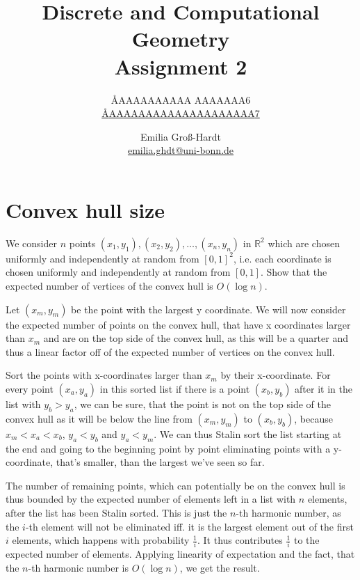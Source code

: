 \documentclass{article}
\title{Discrete and Computational Geometry \\ Assignment 2}
\author{
  \AA{AAAAAAAAAA AAAAAAA}{6} \\
  \href{mailto:\AA{AAAAAAAAAAAAAAAAAAAA}{7}}{\AA{AAAAAAAAAAAAAAAAAAAA}{7}}
  \and
  Emilia Groß-Hardt \\
  \href{mailto:emilia.ghdt@uni-bonn.de}{emilia.ghdt@uni-bonn.de}
}
\newcommand{\R}{\mathbb{R}}
\begin{document}
  \maketitle

  \section{Convex hull size}
  \begin{centerframebox}
    We consider $n$ points $(x_1, y_1), (x_2, y_2), \dots , (x_n, y_n)$ in $\R^2$ which are chosen uniformly and
    independently at random from $[0, 1]^2$, i.e. each coordinate is chosen uniformly and
    independently at random from $[0, 1]$.
    Show that the expected number of vertices of the convex hull is $O(\log n)$.
  \end{centerframebox}
  Let $(x_m, y_m)$ be the point with the largest y coordinate. We will now consider the expected number of points on the convex hull, that have x coordinates larger than $x_m$ and are on the top side of the convex hull, as this will be a quarter and thus a linear factor off of the expected number of vertices on the convex hull.

  Sort the points with x-coordinates larger than $x_m$ by their x-coordinate. For every point $(x_a, y_a)$ in this sorted list if there is a point $(x_b, y_b)$ after it in the list with $y_b > y_a$, we can be sure, that the point is not on the top side of the convex hull as it will be below the line from $(x_m, y_m)$ to $(x_b, y_b)$, because $x_m < x_a < x_b$, $y_a < y_b$ and $y_a < y_m$. We can thus Stalin sort the list starting at the end and going to the beginning point by point eliminating points with a y-coordinate, that's smaller, than the largest we've seen so far.

  The number of remaining points, which can potentially be on the convex hull is thus bounded by the expected number of elements left in a list with $n$ elements, after the list has been Stalin sorted.
  This is just the $n$-th harmonic number, as the $i$-th element will not be eliminated iff. it is the largest element out of the first $i$ elements, which happens with probability $\frac1i$. It thus contributes $\frac1i$ to the expected number of elements. Applying linearity of expectation and the fact, that the $n$-th harmonic number is $O(\log n)$, we get the result.
\end{document}
